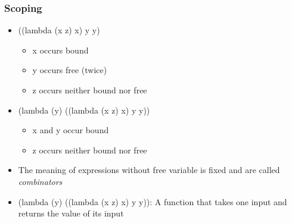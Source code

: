 \documentclass{beamer}
\begin{document}
\begin{frame}[fragile]
\frametitle{Scoping}
\begin{scriptsize}
\begin{itemize}
\item<1-> ((lambda (x z) x) y y)
  \begin{itemize}
    \item x occurs bound
    \item y occurs free (twice)
    \item z occurs neither bound nor free
  \end{itemize}

\item<2-> (lambda (y) ((lambda (x z) x) y y))
  \begin{itemize}
    \item x and y occur bound
    \item z occurs neither bound nor free
  \end{itemize}

\item<3-> The meaning of expressions without free variable is fixed and are called \emph{combinators}

\item<2-> (lambda (y) ((lambda (x z) x) y y)): A function that takes one input and returns the value of its input

\end{itemize}
\end{scriptsize}
\end{frame}
\end{document}
